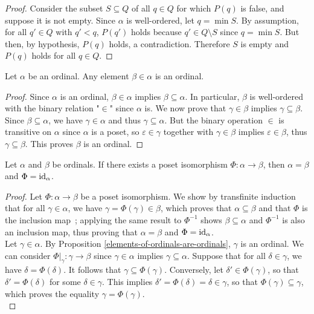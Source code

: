 \begin{proof}
    Consider the subset $S \subseteq Q$ of all $q \in Q$ for which $P(q)$ is false, and suppose it is not empty. Since $\alpha$ is well-ordered, let $q = \min S$. By assumption, for all $q' \in Q$ with $q' < q$, $P(q')$ holds because $q' \in Q \setminus S$ since $q = \min S$. But then, by hypothesis, $P(q)$ holds, a contradiction. Therefore $S$ is empty and $P(q)$ holds for all $q \in Q$.
\end{proof}

\begin{proposition} \label{elements-of-ordinals-are-ordinals}
    Let $\alpha$ be an ordinal. Any element $\beta \in \alpha$ is an ordinal.
\end{proposition}

\begin{proof}
    Since $\alpha$ is an ordinal, $\beta \in \alpha$ implies $\beta \subseteq \alpha$. In particular, $\beta$ is well-ordered with the binary relation "$\in$" since $\alpha$ is. We now prove that $\gamma \in \beta$ implies $\gamma \subseteq \beta$. Since $\beta \subseteq \alpha$, we have $\gamma \in \alpha$ and thus $\gamma \subseteq \alpha$. But the binary operation $\in$ is transitive on $\alpha$ since $\alpha$ is a poset, so $\varepsilon \in \gamma$ together with $\gamma \in \beta$ implies $\varepsilon \in \beta$, thus $\gamma \subseteq \beta$. This proves $\beta$ is an ordinal.
\end{proof}

\begin{theorem} \label{unicity-of-ordinals}
    Let $\alpha$ and $\beta$ be ordinals. If there exists a poset isomorphism $\Phi : \alpha \to \beta$, then $\alpha = \beta$ and $\Phi = \operatorname{\mathrm{id}}_{\alpha}$. 
\end{theorem}

\begin{proof}
    Let $\Phi : \alpha \to \beta$ be a poset isomorphism. We show by transfinite induction that for all $\gamma \in \alpha$, we have $\gamma = \Phi(\gamma) \in \beta$, which proves that $\alpha \subseteq \beta$ and that $\Phi$ is the inclusion map~; applying the same result to $\Phi^{-1}$ shows $\beta \subseteq \alpha$ and $\Phi^{-1}$ is also an inclusion map, thus proving that $\alpha = \beta$ and $\Phi = \operatorname{\mathrm{id}}_{\alpha}$. 
    \\
    
    Let $\gamma \in \alpha$. By Proposition \autoref{elements-of-ordinals-are-ordinals}, $\gamma$ is an ordinal. We can consider $\Phi|_{\gamma} : \gamma \to \beta$ since $\gamma \in \alpha$ implies $\gamma \subseteq \alpha$. Suppose that for all $\delta \in \gamma$, we have $\delta = \Phi(\delta)$. It follows that $\gamma \subseteq \Phi(\gamma)$. Conversely, let $\delta' \in \Phi(\gamma)$, so that $\delta' = \Phi(\delta)$ for some $\delta \in \gamma$. This implies $\delta' = \Phi(\delta) = \delta \in \gamma$, so that $\Phi(\gamma) \subseteq \gamma$, which proves the equality $\gamma = \Phi(\gamma)$.
    \\
\end{proof}

